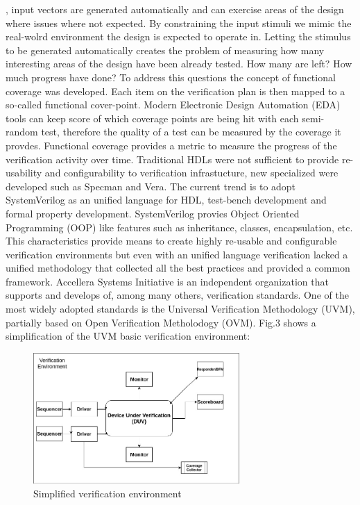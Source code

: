 \documentclass[a4paper,11pt]{article}
\begin{document}
, input vectors are generated automatically and can exercise areas of the design where issues where not expected. By constraining the input stimuli we mimic the real-wolrd environment the design is expected to operate in. Letting the stimulus to be generated automatically creates the problem of measuring how many interesting areas of the design have been already tested. How many are left? How much progress have done? To address this questions the concept of functional coverage was developed. Each item on the verification plan is then mapped to a so-called functional cover-point. Modern Electronic Design Automation (EDA) tools can keep score of which coverage points are being hit with each semi-random test, therefore the quality of a test can be measured by the coverage it provdes. Functional coverage provides a metric to measure the progress of the verification activity over time. Traditional HDLs were not sufficient to provide re-usability and configurability to verification infrastucture, new specialized were developed such as Specman and Vera. The current trend \cite{mentor:study} is to adopt SystemVerilog as an unified language for HDL, test-bench development and formal property development. SystemVerilog provies Object Oriented Programming (OOP) like features such as inheritance, classes, encapsulation, etc. This characteristics provide means to create highly re-usable and configurable verification environments but even with an unified language verification lacked a unified methodology that collected all the best practices and provided a common framework. Accellera Systems Initiative is an independent organization that supports and develops of, among many others, verification standards. One of the most widely adopted standards is the Universal Verification Methodology (UVM), partially based on Open Verification Metholodogy (OVM). Fig.3 shows a simplification of the UVM basic verification environment:
\begin{figure}[h]
\centering
\includegraphics[width=0.7\textwidth]{uvm_environment.jpg}
\caption{Simplified verification environment}
\end{figure} 
\end{document}

